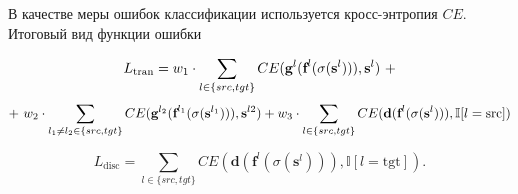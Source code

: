 \documentclass[12pt,twoside]{article}
\begin{document}
   В качестве меры ошибок классификации используется кросс-энтропия $CE$. Итоговый вид функции ошибки

   $$
   L_{\text{tran}} = w_1 \cdot \sum_{l \in \\ \{src, tgt\}} CE(\textbf{g}^{l}(\textbf{f}^{l}(\sigma(\mathbf{s}^{l}))), \mathbf{s}^{l})\ +
   $$
   $$
   +\ w_2 \cdot \sum_{l_1 \ne l_2 \in \\ \{src, tgt\}} CE(\textbf{g}^{l_2}(\textbf{f}^{l_1}(\sigma(\mathbf{s}^{l_1}))), \mathbf{s}^{l2}) +
   w_3 \cdot \sum_{l \in \\ \{src, tgt\}} CE(\textbf{d}(\textbf{f}^{l}(\sigma(\mathbf{s}^{l}))), \mathbb{I}[l = \text{src}])
   $$

   $$
   L_{\text{disc}} = \sum_{l \in \{src, tgt\}} CE(\textbf{d}(\textbf{f}^{l}(\sigma(\mathbf{s}^{l}))), \mathbb{I}[l = \text{tgt}]).
   $$





\end{document}
